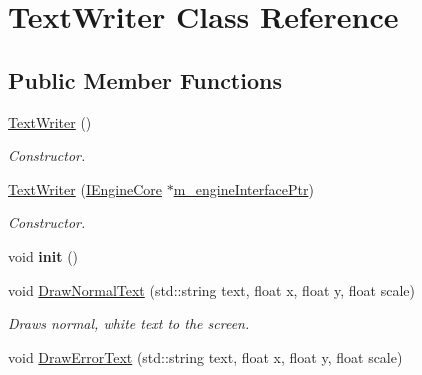 \hypertarget{class_text_writer}{\section{Text\+Writer Class Reference}
\label{class_text_writer}
}
\subsection*{Public Member Functions}
\begin{DoxyCompactItemize}
\item 
\hypertarget{class_text_writer_ad77b980fabda2f931692263a56324446}{\hyperlink{class_text_writer_ad77b980fabda2f931692263a56324446}{Text\+Writer} ()}\label{class_text_writer_ad77b980fabda2f931692263a56324446}

\begin{DoxyCompactList}\small\item\em Constructor. \end{DoxyCompactList}\item 
\hypertarget{class_text_writer_a3e744dcb300d6cbfe90a164d3fdde0b6}{\hyperlink{class_text_writer_a3e744dcb300d6cbfe90a164d3fdde0b6}{Text\+Writer} (\hyperlink{class_i_engine_core}{I\+Engine\+Core} $\ast$\hyperlink{class_text_writer_a322f1ca93660d2385928d301dfdcb379}{m\+\_\+engine\+Interface\+Ptr})}\label{class_text_writer_a3e744dcb300d6cbfe90a164d3fdde0b6}

\begin{DoxyCompactList}\small\item\em Constructor. \end{DoxyCompactList}\item 
\hypertarget{class_text_writer_ad9a5d0bf5c1f6d6e0b148c75df217179}{void {\bfseries init} ()}\label{class_text_writer_ad9a5d0bf5c1f6d6e0b148c75df217179}

\item 
\hypertarget{class_text_writer_af26acc26d285763642169e19284392fb}{void \hyperlink{class_text_writer_af26acc26d285763642169e19284392fb}{Draw\+Normal\+Text} (std\+::string text, float x, float y, float scale)}\label{class_text_writer_af26acc26d285763642169e19284392fb}

\begin{DoxyCompactList}\small\item\em Draws normal, white text to the screen. \end{DoxyCompactList}\item 
\hypertarget{class_text_writer_a180fabccd3230c8765d0612e8097e9c5}{void \hyperlink{class_text_writer_a180fabccd3230c8765d0612e8097e9c5}{Draw\+Error\+Text} (std\+::string text, float x, float y, float scale)}\label{class_text_writer_a180fabccd3230c8765d0612e8097e9c5}


\end{DoxyCompactItemize}
